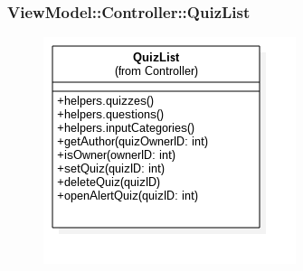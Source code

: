 \subsubsection{ViewModel::Controller::QuizList}
\begin{figure}[h!]
\begin{center}
	\includegraphics[scale=0.4]{../images/ViewModel/Controller/QuizList.png}
\end{center}
\end{figure}
